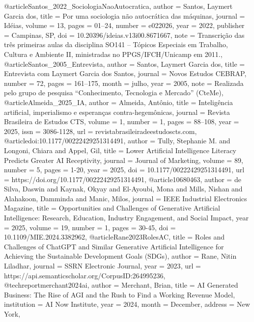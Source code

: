 @article{Santos_2022_SociologiaNaoAutocratica,
  author  = {Santos, Laymert Garcia dos},
  title   = {Por uma sociologia não autocrática das máquinas},
  journal = {Idéias},
  volume  = {13},
  pages   = {01--24},
  number  = {e022026},
  year    = {2022},
  publisher = {Campinas, SP},
  doi     = {10.20396/ideias.v13i00.8671667},
  note    = {Transcrição das três primeiras aulas da disciplina SO141 – Tópicos Especiais em Trabalho, Cultura e Ambiente II, ministradas no PPGS/IFCH/Unicamp em 2011.},
}
@article{Santos_2005_Entrevista,
  author  = {Santos, Laymert Garcia dos},
  title   = {Entrevista com Laymert Garcia dos Santos},
  journal = {Novos Estudos CEBRAP},
  number  = {72},
  pages   = {161--175},
  month   = {julho},
  year    = {2005},
  note    = {Realizada pelo grupo de pesquisa “Conhecimento, Tecnologia e Mercado” (CteMe)},
}
@article{Almeida_2025_IA,
  author  = {Almeida, Antônio},
  title   = {Inteligência artificial, imperialismo e esperanças contra-hegemônicas},
  journal = {Revista Brasileira de Estudos CTS},
  volume  = {1},
  number  = {1},
  pages   = {88--108},
  year    = {2025},
  issn    = {3086-1128},
  url     = {revistabrasileiradeestudoscts.com},
}
@article{doi:10.1177/00222429251314491,
  author  = {Tully, Stephanie M. and Longoni, Chiara and Appel, Gil},
  title   = {Lower Artificial Intelligence Literacy Predicts Greater AI Receptivity},
  journal = {Journal of Marketing},
  volume  = {89},
  number  = {5},
  pages   = {1-20},
  year    = {2025},
  doi     = {10.1177/00222429251314491},
  url     = {https://doi.org/10.1177/00222429251314491},
}
@article{10680463,
  author  = {de Silva, Daswin and Kaynak, Okyay and El-Ayoubi, Mona and Mills, Nishan and Alahakoon, Damminda and Manic, Milos},
  journal = {IEEE Industrial Electronics Magazine},
  title   = {Opportunities and Challenges of Generative Artificial Intelligence: Research, Education, Industry Engagement, and Social Impact},
  year    = {2025},
  volume  = {19},
  number  = {1},
  pages   = {30-45},
  doi     = {10.1109/MIE.2024.3382962},
}
@article{Rane2023RolesAC,
  title   = {Roles and Challenges of ChatGPT and Similar Generative Artificial Intelligence for Achieving the Sustainable Development Goals (SDGs)},
  author  = {Rane, Nitin Liladhar},
  journal = {SSRN Electronic Journal},
  year    = {2023},
  url     = {https://api.semanticscholar.org/CorpusID:264995236},
}
@techreport{merchant2024ai,
  author      = {Merchant, Brian},
  title       = {AI Generated Business: The Rise of AGI and the Rush to Find a Working Revenue Model},
  institution = {AI Now Institute},
  year        = {2024},
  month       = {December},
  address     = {New York},
}
